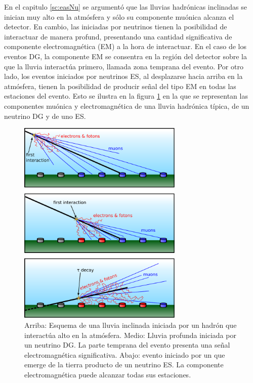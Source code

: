 	En el capitulo \ref{sc:easNu} se argumentó que las lluvias hadrónicas inclinadas se inician muy alto en la atmósfera y sólo su componente muónica alcanza el detector.
	En cambio, las iniciadas por neutrinos tienen la posibilidad de interactuar de manera profund, presentando una cantidad significativa de componente electromagnética (EM) a la hora de interactuar.
	En el caso de los eventos DG, la componente EM se consentra en la región del detector sobre la que la lluvia interactúa primero, llamada zona temprana del evento.
	Por otro lado, los eventos iniciados por neutrinos ES, al desplazarse hacia arriba en la atmósfera, tienen la posibilidad de producir señal del tipo EM en todas las estaciones del evento.
	Esto se ilustra en la figura \ref{fig:compNus} en la que se representan las componentes muónica y electromagnética de una lluvia hadrónica típica, de un neutrino DG y de uno ES.
	\begin{figure}[ht!]
		\begin{center}
		\includegraphics[width=0.7\textwidth]{fig/seleccionAuger/inclined_regular_dg_and_up}
		\caption{Arriba: Esquema de una lluvia inclinada iniciada por un hadrón que interactúa alto en la atmósfera. Medio: Lluvia profunda iniciada por un neutrino DG. La parte temprana del evento presenta una señal electromagnética significativa. Abajo: evento iniciado por un \tauon{} que emerge de la tierra producto de un neutrino ES. La componente electromagnética puede alcanzar todas sus estaciones.}
		\label{fig:compNus}
		\end{center}
	\end{figure}
	
